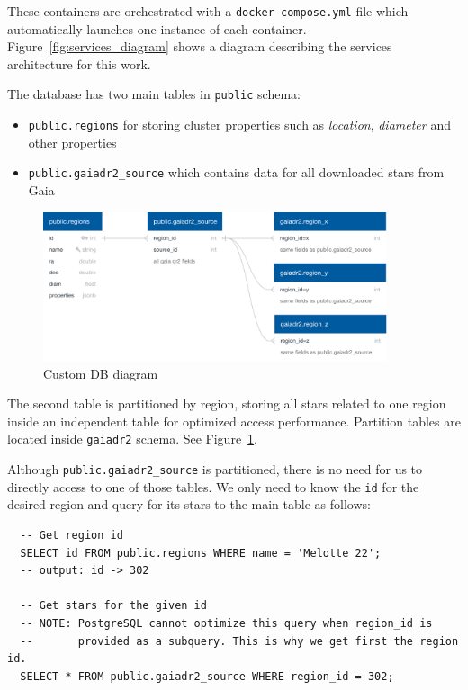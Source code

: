 \documentclass[11pt, a4paper, english]{book}
\begin{document}
These containers are orchestrated with a \verb|docker-compose.yml| file which automatically launches one instance of each container.
Figure~\ref{fig:services_diagram} shows a diagram describing the services architecture for this work.

The database has two main tables in \verb|public| schema:

\begin{itemize}
  \item \verb|public.regions| for storing cluster properties such as \emph{location}, \emph{diameter} and other properties
  \item \verb|public.gaiadr2_source| which contains data for all downloaded stars from Gaia
\end{itemize}

\begin{figure}[htbp]
  \centering
  \includegraphics[width=0.9\textwidth]{../figures/customdb_diagram.pdf}
  \caption{Custom DB diagram}
  \label{fig:customdb_diagram}
\end{figure}

The second table is partitioned by region,
storing all stars related to one region inside an independent table for optimized access performance.
Partition tables are located inside \verb|gaiadr2| schema. See Figure~\ref{fig:customdb_diagram}.

Although \verb|public.gaiadr2_source| is partitioned, there is no need for us to directly access to one of those tables.
We only need to know the \verb|id| for the desired region and query for its stars to the main table as follows:

\pagebreak

\begin{verbatim}
  -- Get region id
  SELECT id FROM public.regions WHERE name = 'Melotte 22';
  -- output: id -> 302

  -- Get stars for the given id
  -- NOTE: PostgreSQL cannot optimize this query when region_id is
  --       provided as a subquery. This is why we get first the region id.
  SELECT * FROM public.gaiadr2_source WHERE region_id = 302;
\end{verbatim}
\end{document}
